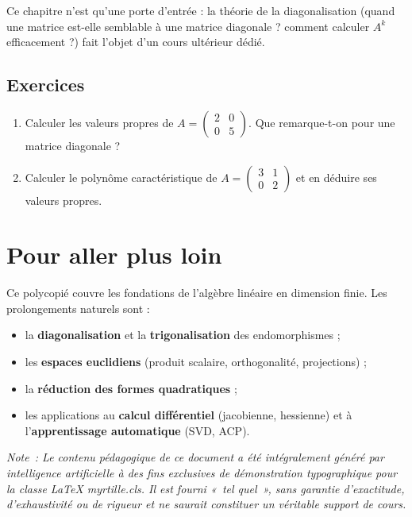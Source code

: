\documentclass[theme=pringlea]{myrtille}
\begin{document}
\begin{infobox}
Ce chapitre n'est qu'une porte d'entrée : la théorie de la diagonalisation (quand une matrice est-elle semblable à une matrice diagonale ? comment calculer $A^k$ efficacement ?) fait l'objet d'un cours ultérieur dédié.
\end{infobox}

\subsection{Exercices}
\begin{enumerate}
    \item Calculer les valeurs propres de $A = \begin{pmatrix} 2 & 0 \\ 0 & 5 \end{pmatrix}$. Que remarque-t-on pour une matrice diagonale ?
    \item Calculer le polynôme caractéristique de $A = \begin{pmatrix} 3 & 1 \\ 0 & 2 \end{pmatrix}$ et en déduire ses valeurs propres.
\end{enumerate}


\section{Pour aller plus loin}
Ce polycopié couvre les fondations de l'algèbre linéaire en dimension finie. Les prolongements naturels sont :
\begin{itemize}
    \item la \textbf{diagonalisation} et la \textbf{trigonalisation} des endomorphismes ;
    \item les \textbf{espaces euclidiens} (produit scalaire, orthogonalité, projections) ;
    \item la \textbf{réduction des formes quadratiques} ;
    \item les applications au \textbf{calcul différentiel} (jacobienne, hessienne) et à l'\textbf{apprentissage automatique} (SVD, ACP).
\end{itemize}
\vspace{5pt}
\begin{center}
\textit{Note~: Le contenu pédagogique de ce document a été intégralement généré par intelligence artificielle à des fins exclusives de démonstration typographique pour la classe \LaTeX{} myrtille.cls. Il est fourni «~tel quel~», sans garantie d'exactitude, d'exhaustivité ou de rigueur et ne saurait constituer un véritable support de cours.} \\
\vspace{10pt}
{\Large \ccby} 
\end{center}
\end{document}
